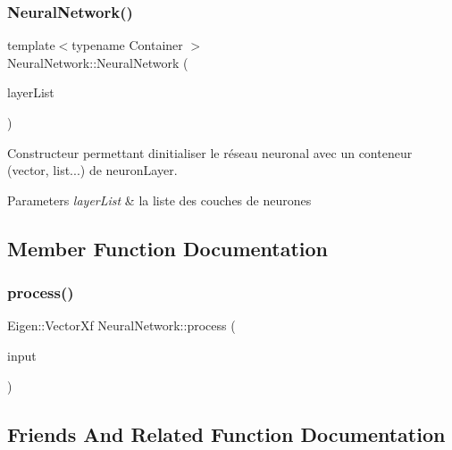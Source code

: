\subsubsection{\texorpdfstring{Neural\+Network()}{NeuralNetwork()}\hspace{0.1cm}{\footnotesize\ttfamily [4/4]}}
{\footnotesize\ttfamily template$<$typename Container $>$ \\
Neural\+Network\+::\+Neural\+Network (\begin{DoxyParamCaption}\item[{Container}]{layer\+List }\end{DoxyParamCaption})}



Constructeur permettant d\textquotesingle{}initialiser le réseau neuronal avec un conteneur (vector, list...) de neuron\+Layer. 


\begin{DoxyParams}{Parameters}
{\em layer\+List} & la liste des couches de neurones \\
\hline
\end{DoxyParams}


\subsection{Member Function Documentation}
\mbox{\label{classNeuralNetwork_a98cab3b3726fbf06dca316068c29c783}} 
\subsubsection{\texorpdfstring{process()}{process()}}
{\footnotesize\ttfamily Eigen\+::\+Vector\+Xf Neural\+Network\+::process (\begin{DoxyParamCaption}\item[{Eigen\+::\+Vector\+Xf}]{input }\end{DoxyParamCaption})}



\subsection{Friends And Related Function Documentation}
\mbox{\label{classNeuralNetwork_a0ecebf9a494437efb917804ed271e13f}} 
